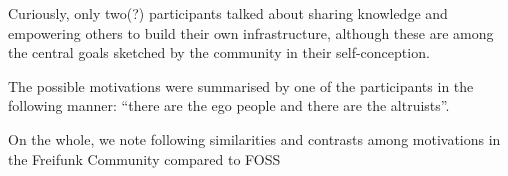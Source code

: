 Curiously, only two(?) participants talked about sharing knowledge and empowering others to build their own infrastructure, although these are among the central goals sketched by the community in their self-conception\cite{ffweb}.

The possible motivations were summarised by one of the participants in the following manner: ``there are the ego people and there are the altruists''.

On the whole, we note following similarities and contrasts among motivations in the Freifunk Community compared to FOSS

\begin{comment}
  ## Spannend (Manche zusammengefasste Beobachtungen):

* Nicht alle verstehen das selbe unter Netzneutralität und nicht alle erachten das als wichtig (je nach Verständnis)
* (initielle) Mitmachmotivationen verschiedener Generationen werden sichtbar:
  ** Menschen, die vor 2008 angefangen haben: Probleme mit (schnellem) Internetzugang bekommen, man nimmt das in die eigenen Hände
  ** Menschen, die später angefangen haben: eher aus Interesse an Netzwerktechnik/ finden die polit. Idee gut
* mehrere sprechen den Community-Aspect an: also die Möglichkeit gemeinsam ein Projekt aufzubauen, interessante Menschen kennen zu lernen, "aus dem eigenen Dunst rauskommen"
* nicht viele Menschen sprechen die Idee an, das eigene Wissen zu teilen (auch wenn es eine der Zentralthemen in der Selbstdarstellung vom Projekt ist)
* "es gibt die Ego-Leute und es gibt die Altruisten"


##  Gemeinsamkeiten/Unterschiede in den Motivationen

* niemand macht Freifunk, weil er_sie dafür bezahlt wird
* (fast) niemand nimmt am Projekt teil, weil er_sie sich davon bessere Kontakte/Jobchancen verspricht (wird eher als Nebenprodukt gesehen) (an FOSS dagegen angeblich schon)
* sowohl bei FOSS als auch bei Freifunk gibt es Menschen, die aus persönlichen Bedürfnissen teilnehmen ("Ich hatte kein Netz" / "Ich brauchte das Feature XY")
* auch wenn mir unklar ist, wie ich Altruismus messen sollte, scheinen bei Freifunk die Mehrheit der Menschen von der politischen Idee einer dezentralen autonomen Kommunikationsinfrastruktur bewegt zu werden
* Communitybildung/-zugehörigkeit wichtig
* ein Großteil der Menschen findet die Beschäftigung mit Netzwerken spannend
* einige wollen ihre Netzwerkkenntnisse und -fähigkeiten ausbauen, scheint aber nicht so in Fokus zu sein (dagegen bei FOSS eher)

---

Die Papers beschäftigen sich (vor allem) mit der Motivation von Entwickler*innen. Allerdings gibt es auch andere Möglichkeiten zu beiden Communities beizutragen (user documentation, publicity, design, Übersetzung, ...). Kann man sich da andere Motivationen vorstellen?
\end{comment}

